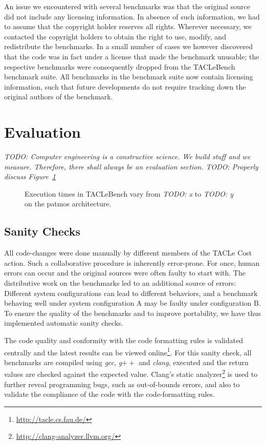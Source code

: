\documentclass[a4paper,UKenglish]{oasics}
\newcommand{\todo}[1]{{\emph{TODO: #1}}}
\begin{document}
An issue we encountered with several benchmarks was that the original
source did not include any licensing information. In absence of such
information, we had to assume that the copyright holder reserves all
rights. Wherever necessary, we contacted the copyright holders to
obtain the right to use, modify, and redistribute the benchmarks. In a
small number of cases we however discovered that the code was in fact
under a license that made the benchmark unusable; the respective
benchmarks were consequently dropped from the TACLeBench benchmark
suite. All benchmarks in the benchmark suite now contain licensing
information, such that future developments do not require tracking
down the original authors of the benchmark.

\section{Evaluation}
\label{sec:eval}

\todo{Computer engineering is a constructive science. We build stuff and we measure.
Therefore, there shall always be an evaluation section.}
\todo{Properly discuss Figure~\ref{fig:execution-times}}
\begin{figure}[t]
  \def\resultfile{eval/wcet.csv}
  
  \caption{Execution times in TACLeBench vary from \todo{x} to \todo{y} on the patmos architecture.}
  \label{fig:execution-times}
\end{figure}

\subsection{Sanity Checks}
All code-changes were done manually by different members of the TACLe Cost action.
Such a collaborative procedure is inherently error-prone.
For once, human errors can occur and the original sources were often faulty to start with.
The distributive work on the benchmarks led to an additional source of errors:
Different system configurations can lead to different behaviors, and a benchmark behaving well under system configuration A may be faulty under configuration B.
To ensure the quality of the benchmarks and to improve portability, we have thus implemented automatic sanity checks.

The code quality and conformity with the code formatting rules is validated centrally and the latest results can be viewed online\footnote{\url{http://tacle.cs.fau.de/}}.
For this sanity check, all benchmarks are compiled using \textit{gcc}, \textit{g$++$} and \textit{clang}, executed and the return values are checked against the expected value.
Clang's static analyzer\footnote{\url{http://clang-analyzer.llvm.org/}} is used to further reveal programming bugs, such as out-of-bounds errors, and also to validate the compliance of the code with the code-formatting rules.
\end{document}
